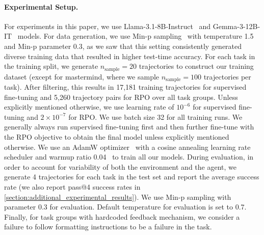 \documentclass{article}
\theoremstyle{plain}
\theoremstyle{definition}
\theoremstyle{remark}
\begin{document}
\paragraph{Experimental Setup.}
For experiments in this paper, we use Llama-3.1-8B-Instruct~\citep{grattafiori2024llama3herdmodels} and Gemma-3-12B-IT~\citep{gemmateam2025gemma3technicalreport} models. For data generation, we use Min-p sampling~\citep{nguyen2024turning} with temperature 1.5 and Min-p parameter 0.3, as we saw that this setting consistently generated diverse training data that resulted in higher test-time accuracy. For each task in the training split, we generate $n_\text{sample} = 20$ trajectories to construct our training dataset (except for mastermind, where we sample $n_{\text{sample}} = 100$ trajectories per task). After filtering, this results in 17,181 training trajectories for supervised fine-tuning and 5,260 trajectory pairs for RPO over all task groups. Unless explicitly mentioned otherwise, we use learning rate of $10^{-6}$ for supervised fine-tuning and $2 \times 10^{-7}$ for RPO. We use batch size 32 for all training runs. We generally always run supervised fine-tuning first and then further fine-tune with the RPO objective to obtain the final model unless explicitly mentioned otherwise. We use an AdamW optimizer~\citep{loshchilov2019decoupledweightdecayregularization} with a cosine annealing learning rate scheduler and warmup ratio 0.04~\citep{loshchilov2017sgdrstochasticgradientdescent} to train all our models.
During evaluation, in order to account for variability of both the environment and the agent, we generate 4 trajectories for each task in the test set and report the average success rate (we also report pass@4 success rates in \cref{section:additional_experimental_results}). We use Min-p sampling with parameter 0.3 for evaluation. Default temperature for evaluation is set to 0.7. Finally, for task groups with hardcoded feedback mechanism, we consider a failure to follow formatting instructions to be a failure in the task.
\end{document}
